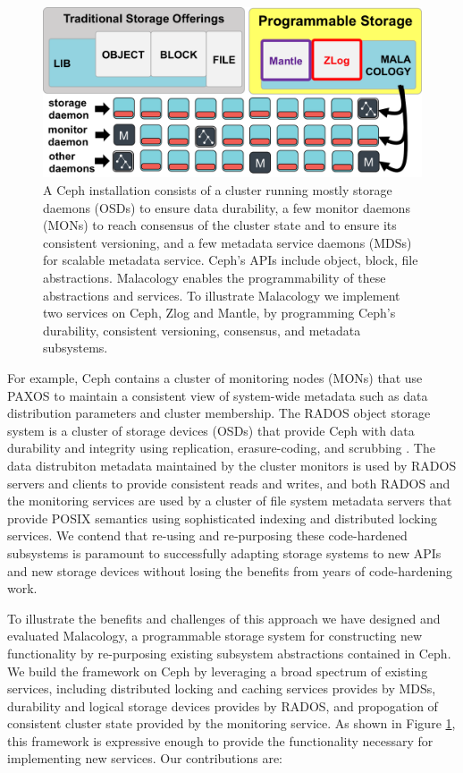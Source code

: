 \documentclass[10pt,twocolumn]{article}
\begin{document}
\begin{figure}[htbp]
\centering
\includegraphics{figures/overview.png}
\caption{A Ceph installation consists of a cluster running mostly
storage daemons (OSDs) to ensure data durability, a few monitor daemons
(MONs) to reach consensus of the cluster state and to ensure its
consistent versioning, and a few metadata service daemons (MDSs) for
scalable metadata service. Ceph's APIs include object, block, file
abstractions. Malacology enables the programmability of these
abstractions and services. To illustrate Malacology we implement two
services on Ceph, Zlog and Mantle, by programming Ceph's durability,
consistent versioning, consensus, and metadata subsystems.
\label{fig:overview}}
\end{figure}

For example, Ceph \autocite{weil_ceph_2006} contains a cluster of
monitoring nodes (MONs) that use PAXOS to maintain a consistent view of
system-wide metadata such as data distribution parameters and cluster
membership. The RADOS object storage system is a cluster of storage
devices (OSDs) that provide Ceph with data durability and integrity
using replication, erasure-coding, and scrubbing
\autocite{weil_rados_2007}. The data distrubiton metadata maintained by
the cluster monitors is used by RADOS servers and clients to provide
consistent reads and writes, and both RADOS and the monitoring services
are used by a cluster of file system metadata servers that provide POSIX
semantics using sophisticated indexing and distributed locking services.
We contend that re-using and re-purposing these code-hardened subsystems
is paramount to successfully adapting storage systems to new APIs and
new storage devices without losing the benefits from years of
code-hardening work.

To illustrate the benefits and challenges of this approach we have
designed and evaluated Malacology, a programmable storage system for
constructing new functionality by re-purposing existing subsystem
abstractions contained in Ceph. We build the framework on Ceph by
leveraging a broad spectrum of existing services, including distributed
locking and caching services provides by MDSs, durability and logical
storage devices provides by RADOS, and propogation of consistent cluster
state provided by the monitoring service. As shown in Figure
\ref{fig:overview}, this framework is expressive enough to provide the
functionality necessary for implementing new services. Our contributions
are:
\end{document}
